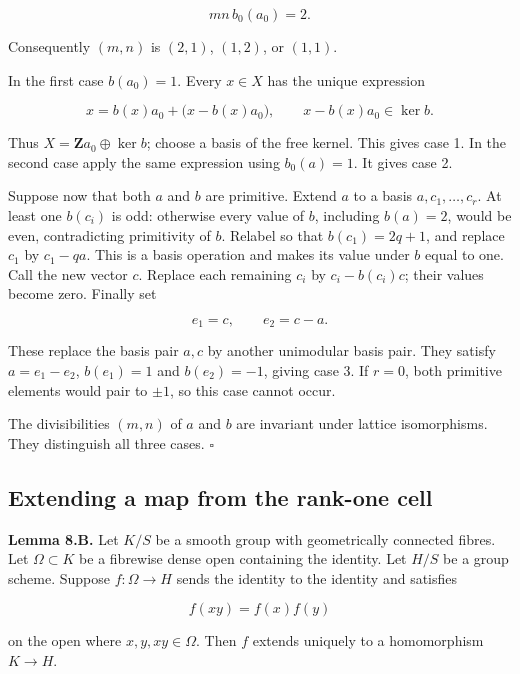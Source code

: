 \documentclass[11pt,a4paper,openany]{report}
\begin{document}
\[
mn\,b_0(a_0)=2.
\]

Consequently \((m,n)\) is \((2,1)\), \((1,2)\), or \((1,1)\).

In the first case \(b(a_0)=1\). Every \(x\in X\) has the unique expression

\[
x=b(x)a_0+\bigl(x-b(x)a_0\bigr),
\qquad x-b(x)a_0\in\ker b.
\]

Thus \(X=\mathbf Z a_0\oplus\ker b\); choose a basis of the free kernel. This gives case 1. In the second case apply the same expression using \(b_0(a)=1\). It gives case 2.

Suppose now that both \(a\) and \(b\) are primitive. Extend \(a\) to a basis \(a,c_1,\ldots,c_r\). At least one \(b(c_i)\) is odd: otherwise every value of \(b\), including \(b(a)=2\), would be even, contradicting primitivity of \(b\). Relabel so that \(b(c_1)=2q+1\), and replace \(c_1\) by \(c_1-qa\). This is a basis operation and makes its value under \(b\) equal to one. Call the new vector \(c\). Replace each remaining \(c_i\) by \(c_i-b(c_i)c\); their values become zero. Finally set

\[
e_1=c,\qquad e_2=c-a.
\]

These replace the basis pair \(a,c\) by another unimodular basis pair. They satisfy \(a=e_1-e_2\), \(b(e_1)=1\) and \(b(e_2)=-1\), giving case 3. If \(r=0\), both primitive elements would pair to \(\pm1\), so this case cannot occur.

The divisibilities \((m,n)\) of \(a\) and \(b\) are invariant under lattice isomorphisms. They distinguish all three cases. \(\square\)

\subsection{Extending a map from the rank-one cell}\label{AG-RG-03-extending-a-map-from-the-rank-one-cell}

\textbf{Lemma 8.B.} Let \(K/S\) be a smooth group with geometrically connected fibres. Let \(\Omega\subset K\) be a fibrewise dense open containing the identity. Let \(H/S\) be a group scheme. Suppose \(f:\Omega\to H\) sends the identity to the identity and satisfies

\[
f(xy)=f(x)f(y)
\]

on the open where \(x,y,xy\in\Omega\). Then \(f\) extends uniquely to a homomorphism \(K\to H\).
\end{document}
